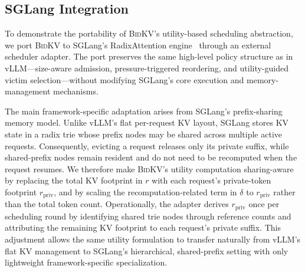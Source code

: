 \documentclass[conference]{IEEEtran}
\newcommand{\bidkv}{\textsc{BidKV}\xspace}
\newcommand{\tokfree}{\ensuremath{r}}
\newcommand{\qualdelta}{\ensuremath{\delta}}
\begin{document}


\subsection{SGLang Integration}\label{sec:impl:sglang}

To demonstrate the portability of \bidkv's utility-based scheduling abstraction, we port \bidkv to SGLang's RadixAttention engine~\cite{Zheng2024sglang} through an external scheduler adapter. The port preserves the same high-level policy structure as in vLLM---size-aware admission, pressure-triggered reordering, and utility-guided victim selection---without modifying SGLang's core execution and memory-management mechanisms.

The main framework-specific adaptation arises from SGLang's prefix-sharing memory model. Unlike vLLM's flat per-request KV layout, SGLang stores KV state in a radix trie whose prefix nodes may be shared across multiple active requests. Consequently, evicting a request releases only its private suffix, while shared-prefix nodes remain resident and do not need to be recomputed when the request resumes. We therefore make \bidkv's utility computation sharing-aware by replacing the total KV footprint in $\tokfree$ with each request's private-token footprint $r_{\mathrm{priv}}$, and by scaling the recomputation-related term in $\qualdelta$ to $r_{\mathrm{priv}}$ rather than the total token count. Operationally, the adapter derives $r_{\mathrm{priv}}$ once per scheduling round by identifying shared trie nodes through reference counts and attributing the remaining KV footprint to each request's private suffix. This adjustment allows the same utility formulation to transfer naturally from vLLM's flat KV management to SGLang's hierarchical, shared-prefix setting with only lightweight framework-specific specialization.
\end{document}
